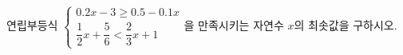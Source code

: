 연립부등식 $\begin{cases} 0.2x-3\ge 0.5-0.1x \\[4pt] \dfrac{1}{2}x+\dfrac{5}{6}<\dfrac{2}{3}x+1 \end{cases}$을 만족시키는 자연수 $x$의 최솟값을 구하시오.
